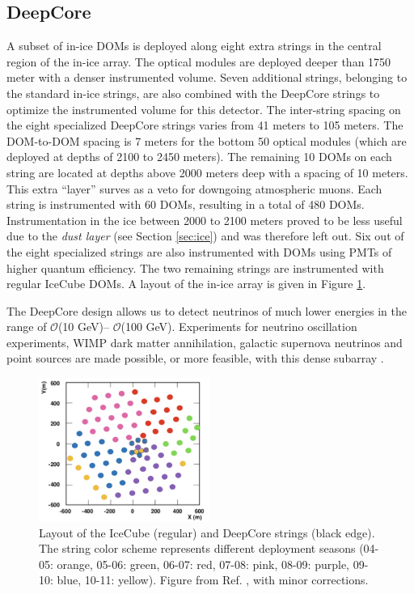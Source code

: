 \subsection{DeepCore}
\label{subsec:DC}
A subset of in-ice DOMs is deployed along eight extra strings in the central region of the in-ice array. The optical modules are deployed deeper than 1750 meter with a denser instrumented volume. Seven additional strings, belonging to the standard in-ice strings, are also combined with the DeepCore strings to optimize the instrumented volume for this detector. The inter-string spacing on the eight specialized DeepCore strings varies from 41 meters to 105 meters. The DOM-to-DOM spacing is 7 meters for the bottom 50 optical modules (which are deployed at depths of 2100 to 2450 meters). The remaining 10 DOMs on each string are located at depths above 2000 meters deep with a spacing of 10 meters. This extra ``layer'' surves as a veto for downgoing atmospheric muons. Each string is instrumented with 60 DOMs, resulting in a total of 480 DOMs. Instrumentation in the ice between 2000 to 2100 meters proved to be less useful due to the \textit{dust layer} (see Section \ref{sec:ice}) and was therefore left out. Six out of the eight specialized strings are also instrumented with DOMs using PMTs of higher quantum efficiency. The two remaining strings are instrumented with regular IceCube DOMs. A layout of the in-ice array is given in Figure \ref{fig:layoutIC}.

The DeepCore design allows us to detect neutrinos of much lower energies in the range of $\mathcal{O}$(10 GeV)– $\mathcal{O}$(100 GeV). Experiments for neutrino oscillation experiments, WIMP dark matter annihilation, galactic supernova neutrinos and point sources are made possible, or more feasible, with this dense subarray \cite{Collaboration:2011ym}.

\begin{figure}[t]
\centering
\includegraphics[width=0.5\textwidth]{chapter5/img/layoutIC.png}
\caption{Layout of the IceCube (regular) and DeepCore strings (black edge). The string color scheme represents different deployment seasons (04-05: orange, 05-06: green, 06-07: red, 07-08: pink, 08-09: purple, 09-10: blue, 10-11: yellow). Figure from Ref. \cite{Choma:2018zbe}, with minor corrections.}
\label{fig:layoutIC}
\end{figure}

